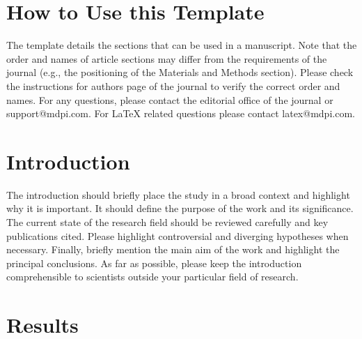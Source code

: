 \documentclass[sensors,article,submit,moreauthors]{Definitions/mdpi}
\begin{document}

\setcounter{section}{-1} %
\section{How to Use this Template}
The template details the sections that can be used in a manuscript. Note that the order and names of article sections may differ from the requirements of the journal (e.g., the positioning of the Materials and Methods section). Please check the instructions for authors page of the journal to verify the correct order and names. For any questions, please contact the editorial office of the journal or support@mdpi.com. For LaTeX related questions please contact latex@mdpi.com.

\section{Introduction}
The introduction should briefly place the study in a broad context and highlight why it is important. It should define the purpose of the work and its significance. The current state of the research field should be reviewed carefully and key publications cited. Please highlight controversial and diverging hypotheses when necessary. Finally, briefly mention the main aim of the work and highlight the principal conclusions. As far as possible, please keep the introduction comprehensible to scientists outside your particular field of research. %
 
\section{Results}
\end{document}

